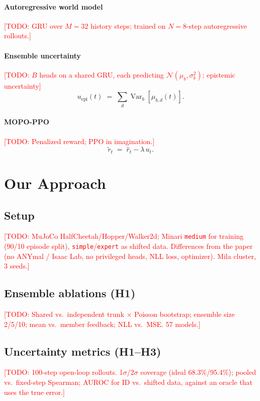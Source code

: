 \documentclass[conference]{IEEEtran}
\newcommand{\todo}[1]{\textcolor{red}{[TODO: #1]}}
\newcommand{\uepi}{u_{\text{epi}}}
\begin{document}
\paragraph{Autoregressive world model}
\todo{GRU over $M{=}32$ history steps; trained on $N{=}8$-step autoregressive rollouts.}

\paragraph{Ensemble uncertainty}
\todo{$B$ heads on a shared GRU, each predicting $\mathcal{N}(\mu_b,\sigma_b^2)$; epistemic
uncertainty}
\begin{equation}
  \uepi(t) \;=\; \sum_{d}\operatorname{Var}_b\!\left[\mu_{b,d}(t)\right].
  \label{eq:uepi}
\end{equation}

\paragraph{MOPO-PPO}
\todo{Penalized reward; PPO in imagination.}
\begin{equation}
  \tilde r_t \;=\; \hat r_t - \lambda\, u_t .
  \label{eq:mopo}
\end{equation}

\section{Our Approach}
\label{sec:method-ours}

\subsection{Setup}
\todo{MuJoCo HalfCheetah/Hopper/Walker2d; Minari \texttt{medium} for training (90/10 episode
split), \texttt{simple}/\texttt{expert} as shifted data. Differences from the paper (no ANYmal /
Isaac Lab, no privileged heads, NLL loss, optimizer). Mila cluster, 3 seeds.}

\subsection{Ensemble ablations (H1)}
\todo{Shared vs.\ independent trunk $\times$ Poisson bootstrap; ensemble size 2/5/10;
mean vs.\ member feedback; NLL vs.\ MSE. 57 models.}

\subsection{Uncertainty metrics (H1--H3)}
\todo{100-step open-loop rollouts. 1$\sigma$/2$\sigma$ coverage (ideal 68.3\%/95.4\%);
pooled vs.\ fixed-step Spearman; AUROC for ID vs.\ shifted data, against an oracle that uses the
true error.}
\end{document}
